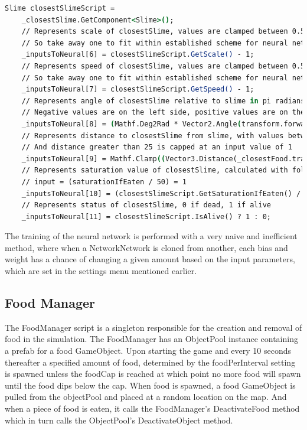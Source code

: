 \begin{lstlisting}[language=csh, caption=Neural Networks inputs for other slime, label={lst:neuralNetworkOtherSlimes}]
    Slime closestSlimeScript =
    _closestSlime.GetComponent<Slime>();
    // Represents scale of closestSlime, values are clamped between 0.5 and 2 typically
    // So take away one to fit within established scheme for neural net inputs
    _inputsToNeural[6] = closestSlimeScript.GetScale() - 1;
    // Represents speed of closestSlime, values are clamped between 0.5 and 2 typically
    // So take away one to fit within established scheme for neural net inputs
    _inputsToNeural[7] = closestSlimeScript.GetSpeed() - 1;
    // Represents angle of closestSlime relative to slime in pi radians to fit in with scheme of inputs being -1 to 1,
    // Negative values are on the left side, positive values are on the right
    _inputsToNeural[8] = (Mathf.Deg2Rad * Vector2.Angle(transform.forward, (Vector2)(_closestSlime.transform.position - transform.position))) - 1;
    // Represents distance to closestSlime from slime, with values between -1 and 1,
    // And distance greater than 25 is capped at an input value of 1
    _inputsToNeural[9] = Mathf.Clamp((Vector3.Distance(_closestFood.transform.position, transform.position) / 12.5f) - 1f, -1f, 1f);
    // Represents saturation value of closestSlime, calculated with following formula,
    // input = (saturationIfEaten / 50) = 1
    _inputsToNeural[10] = (closestSlimeScript.GetSaturationIfEaten() / 50f) - 1;
    // Represents status of closestSlime, 0 if dead, 1 if alive
    _inputsToNeural[11] = closestSlimeScript.IsAlive() ? 1 : 0;
\end{lstlisting}
\par
The training of the neural network is performed with a very naive and inefficient method, where when a NetworkNetwork is cloned from another, each bias and weight has a chance of changing a given amount based on the input parameters, which are set in the settings menu mentioned earlier.
\subsection{Food Manager}
The FoodManager script is a singleton responsible for the creation and removal of food in the simulation. The FoodManager has an ObjectPool instance containing a prefab for a food GameObject. Upon starting the game and every 10 seconds thereafter a specified amount of food, determined by the foodPerInterval setting is spawned unless the foodCap is reached at which point no more food will spawn until the food dips below the cap. When food is spawned, a food GameObject is pulled from the objectPool and placed at a random location on the map. And when a piece of food is eaten, it calls the FoodManager's DeactivateFood method which in turn calls the ObjectPool's DeactivateObject method.

